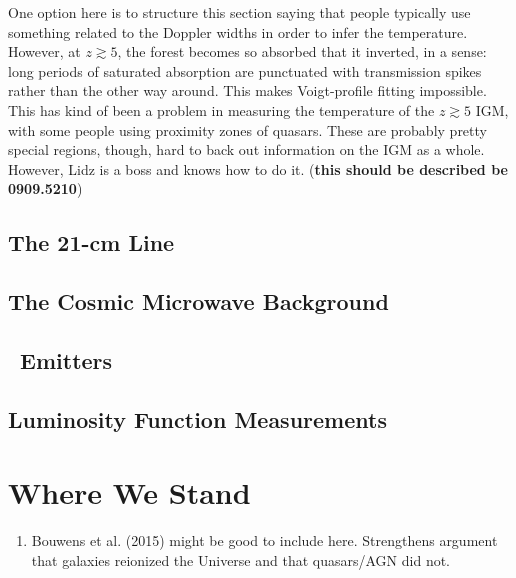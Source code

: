 One option here is to structure this section saying that people typically use something related to the Doppler widths in order to infer the temperature. However, at $z \gtrsim 5$, the forest becomes so absorbed that it inverted, in a sense: long periods of saturated absorption are punctuated with transmission spikes rather than the other way around. This makes Voigt-profile fitting impossible. This has kind of been a problem in measuring the temperature of the $z \gtrsim 5$ IGM, with some people using proximity zones of quasars. These are probably pretty special regions, though, hard to back out information on the IGM as a whole. However, Lidz is a boss and knows how to do it. ({\bf this should be described be 0909.5210}) 


\subsection{The 21-cm Line}
\subsection{The Cosmic Microwave Background}
\subsection{\lya\ Emitters}
\subsection{Luminosity Function Measurements}

\section{Where We Stand}

\begin{enumerate}
\item Bouwens et al. (2015) might be good to include here. Strengthens argument that galaxies reionized the Universe and that quasars/AGN did not.
\end{enumerate}



